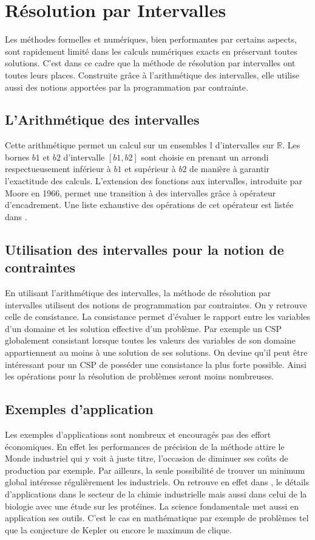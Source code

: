 \section{Résolution par Intervalles}
Les méthodes formelles et numériques, bien performantes par certains aspects, sont rapidement limité dans les calculs numériques exacts en préservant toutes solutions. C'est dans ce cadre que la méthode de résolution par intervalles ont toutes leurs places. Construite grâce à l'arithmétique des intervalles, elle utilise aussi des notions apportées par la programmation par contrainte.
 
\subsection{L'Arithmétique des intervalles}
Cette arithmétique permet un calcul sur un ensembles $\mathbb{I}$ d'intervalles sur $\mathbb{R}$. Les bornes $b1$ et $b2$ d'intervalle $[b1,b2]$ sont choisie en prenant un arrondi respectueusement inférieur à $b1$ et supérieur à $b2$ de manière à garantir l'exactitude des calculs. L'extension des fonctions aux intervalles, introduite par Moore en 1966, permet une transition à des intervalles grâce à opérateur d'encadrement. Une liste exhaustive des opérations de cet opérateur est listée dans \cite{Jermann}.



\subsection{Utilisation des intervalles pour la notion de contraintes}
En utilisant l'arithmétique des intervalles, la méthode de résolution par intervalles utilisent des notions de programmation par contraintes. On y retrouve celle de consistance. La consistance permet d'évaluer le rapport entre les variables d'un domaine et les solution effective d'un problème. Par exemple un CSP globalement consistant lorsque toutes les valeurs des variables de son domaine appartiennent au moins à une solution de ses solutions. On devine qu'il peut être intéressant pour un CSP de posséder une consistance la plus forte possible. Ainsi les opérations pour la résolution de problèmes seront moins nombreuses. 


\subsection{Exemples d'application}
Les exemples d'applications sont nombreux et encouragés pas des effort économiques. En effet les performances de précision de la méthode attire le Monde industriel qui y voit à juste titre, l'occasion de diminuer ses coûts de production par exemple. Par ailleurs, la seule possibilité de trouver un minimum global intéresse régulièrement les industriels. On retrouve en effet dans \cite{Schichl}, le détails d'applications dans le secteur de la chimie industrielle mais aussi dans celui de la biologie avec une étude sur les protéines.
 La science fondamentale met aussi en application ses outils. C'est le cas en mathématique par exemple de problèmes tel que la conjecture de Kepler ou encore le  maximum de clique.
